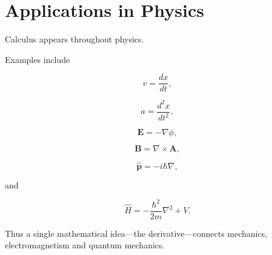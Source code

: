 \section{Applications in Physics}

Calculus appears throughout physics.

Examples include

\[
v=\frac{dx}{dt},
\]

\[
a=\frac{d^2x}{dt^2},
\]

\[
\mathbf E=-\nabla\phi,
\]

\[
\mathbf B=\nabla\times\mathbf A,
\]

\[
\hat{\mathbf p}
=
-i\hbar\nabla,
\]

and

\[
\hat H
=
-\frac{\hbar^2}{2m}\nabla^2+V.
\]

Thus a single mathematical idea—the derivative—connects mechanics,
electromagnetism and quantum mechanics.

